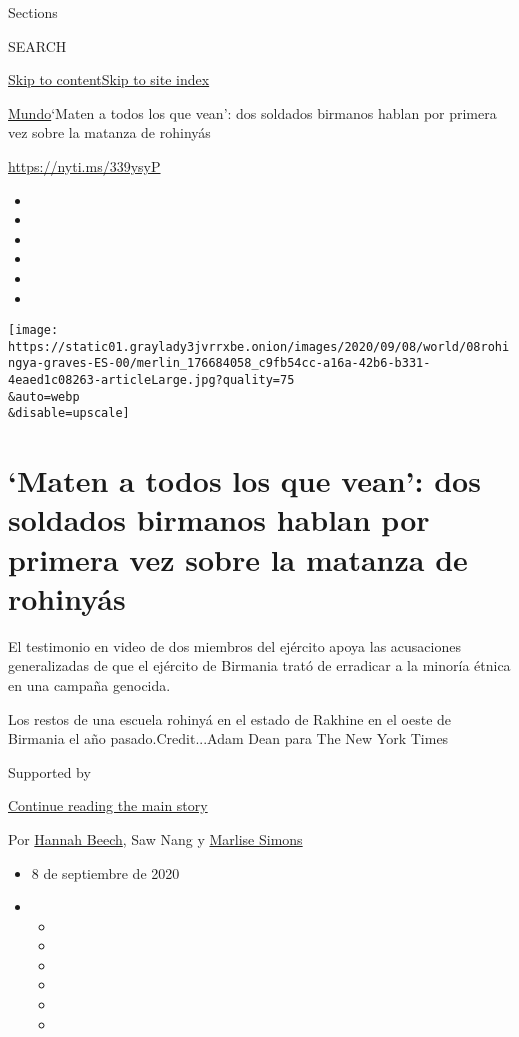 Sections

SEARCH

\protect\hyperlink{site-content}{Skip to
content}\protect\hyperlink{site-index}{Skip to site index}

\href{/es/section/mundo}{Mundo}\textbar{}`Maten a todos los que vean':
dos soldados birmanos hablan por primera vez sobre la matanza de
rohinyás

\url{https://nyti.ms/339ysyP}

\begin{itemize}
\item
\item
\item
\item
\item
\item
\end{itemize}

\texttt{[image: https://static01.graylady3jvrrxbe.onion/images/2020/09/08/world/08rohingya-graves-ES-00/merlin\_176684058\_c9fb54cc-a16a-42b6-b331-4eaed1c08263-articleLarge.jpg?quality=75\\\&auto=webp\\\&disable=upscale]}

\hypertarget{maten-a-todos-los-que-vean-dos-soldados-birmanos-hablan-por-primera-vez-sobre-la-matanza-de-rohinyuxe1s}{%
\section{`Maten a todos los que vean': dos soldados birmanos hablan por
primera vez sobre la matanza de
rohinyás}\label{maten-a-todos-los-que-vean-dos-soldados-birmanos-hablan-por-primera-vez-sobre-la-matanza-de-rohinyuxe1s}}

El testimonio en video de dos miembros del ejército apoya las
acusaciones generalizadas de que el ejército de Birmania trató de
erradicar a la minoría étnica en una campaña genocida.

Los restos de una escuela rohinyá en el estado de Rakhine en el oeste de
Birmania el año pasado.Credit...Adam Dean para The New York Times

Supported by

\protect\hyperlink{after-sponsor}{Continue reading the main story}

Por \href{https://www.nytimes3xbfgragh.onion/by/hannah-beech}{Hannah
Beech}, Saw Nang y
\href{https://www.nytimes3xbfgragh.onion/by/marlise-simons}{Marlise
Simons}

\begin{itemize}
\item
  8 de septiembre de 2020
\item
  \begin{itemize}
  \item
  \item
  \item
  \item
  \item
  \item
  \end{itemize}
\end{itemize}

